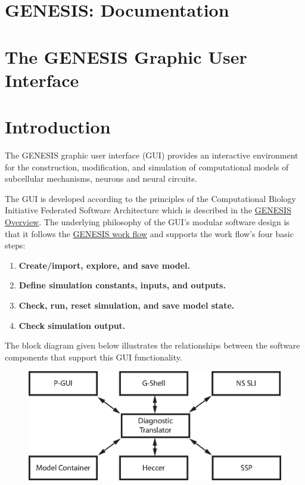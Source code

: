 \documentclass[12pt]{article}
\begin{document}
\section*{GENESIS: Documentation}

\section*{The GENESIS Graphic User Interface}

\section*{Introduction}

The GENESIS graphic user interface (GUI) provides an interactive environment for the construction, modification, and simulation of computational models of subcellular mechanisms, neurons and neural circuits.

The GUI is developed according to the principles of the Computational Biology Initiative Federated Software Architecture which is described in the \href{../genesis-overview/genesis-overview.tex}{GENESIS Overview}. The underlying philosophy of the GUI's modular software design is that it follows the \href{../work-flow/work-flow.tex}{GENESIS work flow} and supports the work flow's four basic steps:
\begin{enumerate}
\item {\bf Create/import, explore, and save model.}
\item {\bf Define simulation constants, inputs, and outputs.}
\item {\bf Check, run, reset simulation, and save model state.}
\item {\bf Check simulation output.}
\end{enumerate}
The block diagram given below illustrates the relationships between the software components that support this GUI functionality.

\begin{figure}[h]
  \centering
\includegraphics[scale=0.6]{figures/gui-isolated.eps}
  \label{fig:df-1}
\end{figure}
\end{document}
